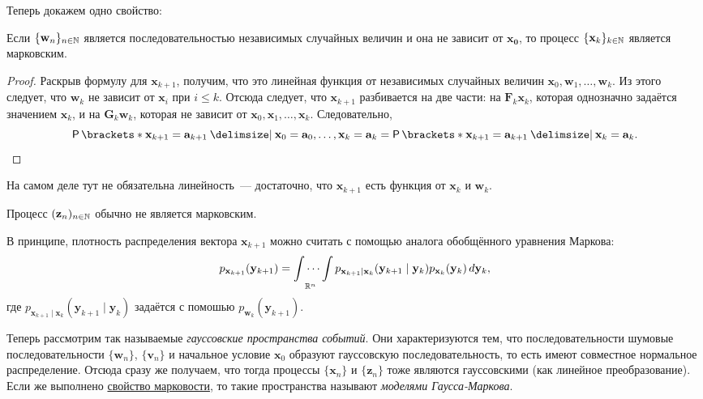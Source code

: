 Теперь докажем одно свойство:
\begin{property}\label{state-space-markov-property}
	Если \(\{\mathbf{w}_{n}\}_{n \in \mathbb{N}}\) является последовательностью 
	независимых случайных величин и она не зависит от \(\mathbf{x_{0}}\), то 
	процесс \(\{\mathbf{x}_{k}\}_{k \in \mathbb{N}}\) является марковским.
\end{property}
\begin{proof}
	Раскрыв формулу для \(\mathbf{x}_{k + 1}\), получим, что это линейная 
	функция от независимых случайных величин \(\mathbf{x}_{0}, \mathbf{w}_{1}, 
	\ldots, \mathbf{w}_{k}\). Из этого следует, что \(\mathbf{w}_{k}\) не 
	зависит от \(\mathbf{x}_{i}\) при \(i \leq k\). Отсюда следует, что 
	\(\mathbf{x}_{k + 1}\) разбивается на две части: на \(\mathbf{F}_{k} 
	\mathbf{x}_{k}\), которая однозначно задаётся значением \(\mathbf{x}_{k}\), 
	и на \(\mathbf{G}_{k}\mathbf{w}_{k}\), которая не зависит от 
	\(\mathbf{x}_{0}, \mathbf{x}_{1}, \ldots, \mathbf{x}_{k}\). Следовательно, 
	\[
		\Pr{\mathbf{x}_{k + 1} = \mathbf{a}_{k + 1} \given \mathbf{x}_{0} = 
		\mathbf{a}_{0}, \ldots, \mathbf{x}_{k} = \mathbf{a}_{k}} = 
		\Pr{\mathbf{x}_{k + 1} = \mathbf{a}_{k + 1} \given \mathbf{x}_{k} = 
		\mathbf{a}_{k}}. \qedhere
	\]
\end{proof}
\begin{remark}
	На самом деле тут не обязательна линейность~--- достаточно, что 
	\(\mathbf{x}_{k + 1}\) есть функция от \(\mathbf{x}_{k}\) и 
	\(\mathbf{w}_{k}\).
\end{remark}
\begin{remark}
	Процесс \((\mathbf{z}_{n})_{n \in \mathbb{N}}\) обычно не является марковским.
\end{remark}
\begin{consequence}
	В принципе, плотность распределения вектора \(\mathbf{x}_{k + 1}\) можно 
	считать с помощью аналога обобщённого уравнения Маркова:
	\[
		p_{\mathbf{x}_{k + 1}}(\mathbf{y}_{k + 1}) = \idotsint\limits_{\mathbb{R}^{n}} 
		p_{\mathbf{x}_{k + 1} \mid \mathbf{x}_{k}}(\mathbf{y}_{k + 1} \mid 
		\mathbf{y}_{k})p_{\mathbf{x}_{k}}(\mathbf{y}_{k}) \mathop{}\!d \mathbf{y}_{k},
	\]
	где \(p_{\mathbf{x}_{k + 1} \mid \mathbf{x}_{k}}(\mathbf{y}_{k + 1} \mid 
	\mathbf{y}_{k})\) задаётся с помошью \(p_{\mathbf{w}_{k}}(\mathbf{y}_{k + 
	1})\).
\end{consequence} 

Теперь рассмотрим так называемые \emph{гауссовские пространства событий}. Они 
характеризуются тем, что последовательности шумовые последовательности 
\(\{\mathbf{w}_{n}\}\), \(\{\mathbf{v}_{n}\}\) и начальное условие 
\(\mathbf{x}_{0}\) образуют гауссовскую последовательность, то есть имеют 
совместное нормальное распределение. Отсюда сразу же получаем, что тогда 
процессы \(\{\mathbf{x}_{n}\}\) и \(\{\mathbf{z}_{n}\}\) тоже являются 
гауссовскими (как линейное преобразование). Если же выполнено 
\hyperref[state-space-markov-property]{свойство марковости}, то такие 
пространства называют \emph{моделями Гаусса-Маркова}.

